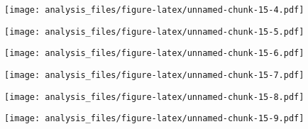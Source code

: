 \documentclass[
]{article}
\newenvironment{Shaded}{\begin{snugshade}}{\end{snugshade}}
\newcommand{\KeywordTok}[1]{\textcolor[rgb]{0.13,0.29,0.53}{\textbf{#1}}}
\newcommand{\NormalTok}[1]{#1}
\newcommand{\OperatorTok}[1]{\textcolor[rgb]{0.81,0.36,0.00}{\textbf{#1}}}
\begin{document}
\texttt{[image: analysis\_files/figure-latex/unnamed-chunk-15-4.pdf]}

\begin{Shaded}
\end{Shaded}

\texttt{[image: analysis\_files/figure-latex/unnamed-chunk-15-5.pdf]}

\begin{Shaded}
\end{Shaded}

\texttt{[image: analysis\_files/figure-latex/unnamed-chunk-15-6.pdf]}

\begin{Shaded}
\end{Shaded}

\texttt{[image: analysis\_files/figure-latex/unnamed-chunk-15-7.pdf]}

\begin{Shaded}
\end{Shaded}

\texttt{[image: analysis\_files/figure-latex/unnamed-chunk-15-8.pdf]}

\begin{Shaded}
\end{Shaded}

\texttt{[image: analysis\_files/figure-latex/unnamed-chunk-15-9.pdf]}

\begin{Shaded}
\end{Shaded}
\end{document}
